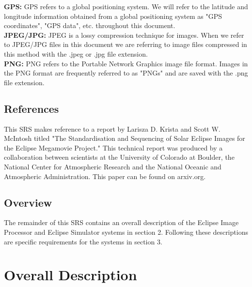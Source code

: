 \documentclass[10pt, onecolumn, draftclsnofoot, letterpaper, compsoc]{IEEEtran}
\begin{document}
	\noindent \textbf{GPS:}
	GPS refers to a global positioning system. We will refer to the
	latitude and longitude information obtained from a global positioning 
	system as "GPS coordinates", "GPS data", etc. throughout this document. \\

	\noindent \textbf{JPEG/JPG:}
	JPEG is a lossy compression technique for images. When we refer
	to JPEG/JPG files in this document we are referring to image files 
	compressed in this method with the .jpeg or .jpg file extension. \\

	\noindent \textbf{PNG:}
	PNG refers to the Portable Network Graphics image file format. 
	Images in the PNG format are frequently referred to as "PNGs" and are 
	saved with the .png file extension. 


\subsection{References}

This SRS makes reference to a report by Larisza D. Krista and Scott W.  
McIntosh titled "The Standardisation and Sequencing of Solar Eclipse Images for 
the Eclipse Megamovie Project." This technical report was produced by a 
collaboration between scientists at the University of Colorado at Boulder, the
 National Center for Atmospheric Research and the National Oceanic and 
 Atmospheric Administration. This paper can be found on arxiv.org.

\subsection{Overview}

The remainder of this SRS contains an overall description of the Eclipse Image
 Processor and Eclipse Simulator systems in section 2. Following these 
 descriptions are specific requirements for the systems in section 3.

\newpage
\section{Overall Description}
\end{document}
